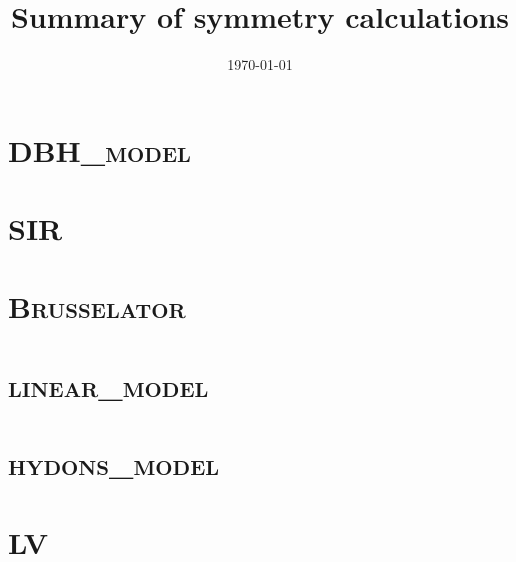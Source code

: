 \documentclass{book}
\begin{document}
\title{\textbf{Summary of symmetry calculations}}
\date{\today}
\maketitle
\tableofcontents
\clearpage
\chapter{\textsc{DBH\_model}}


\chapter{\textsc{SIR}}


\chapter{\textsc{Brusselator}}


\chapter{\textsc{linear\_model}}


\chapter{\textsc{hydons\_model}}


\chapter{\textsc{LV}}

\end{document}
